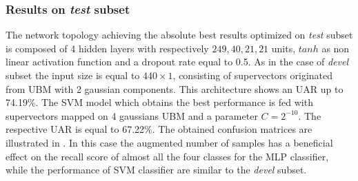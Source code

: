 \subsubsection{Results on \textit{test} subset}
The network topology achieving the absolute best results optimized on \textit{test} subset is composed of 4 hidden layers with respectively ${249, 40, 21, 21}$ units, $tanh$ as non linear activation function and a dropout rate equal to 0.5. As in the case of \textit{devel} subset the input size is equal to $440 \times 1$, consisting of supervectors originated from UBM with 2 gaussian components. This architecture shows an UAR up to 74.19\%. The SVM model which obtains the best performance is fed with supervectors mapped on 4 gaussians UBM and a parameter $C=2^{-10}$. The respective UAR is equal to 67.22\%.
The obtained confusion matrices are illustrated in . In this case the augmented number of samples has a beneficial effect on the recall score of almost all the four classes for the MLP classifier, while the performance of SVM classifier are similar to the \textit{devel} subset.

